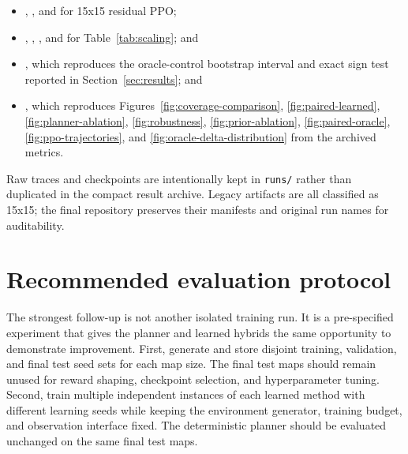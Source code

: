 \documentclass[10pt,letterpaper]{article}
\begin{document}
\begin{itemize}
    \item {}, , and  for 15x15 residual PPO;
    \item {}, , , and  for Table~\ref{tab:scaling}; and
    \item {}, which reproduces the oracle-control bootstrap interval and exact sign test reported in Section~\ref{sec:results}; and
    \item {}, which reproduces Figures~\ref{fig:coverage-comparison}, \ref{fig:paired-learned}, \ref{fig:planner-ablation}, \ref{fig:robustness}, \ref{fig:prior-ablation}, \ref{fig:paired-oracle}, \ref{fig:ppo-trajectories}, and \ref{fig:oracle-delta-distribution} from the archived metrics.
\end{itemize}

Raw traces and checkpoints are intentionally kept in \texttt{runs/} rather than duplicated in the compact result archive. Legacy artifacts are all classified as 15x15; the final repository preserves their manifests and original run names for auditability.

\section{Recommended evaluation protocol}

The strongest follow-up is not another isolated training run. It is a
pre-specified experiment that gives the planner and learned hybrids the same
opportunity to demonstrate improvement. First, generate and store disjoint
training, validation, and final test seed sets for each map size. The final
test maps should remain unused for reward shaping, checkpoint selection, and
hyperparameter tuning. Second, train multiple independent instances of each
learned method with different learning seeds while keeping the environment
generator, training budget, and observation interface fixed. The deterministic
planner should be evaluated unchanged on the same final test maps.
\end{document}
